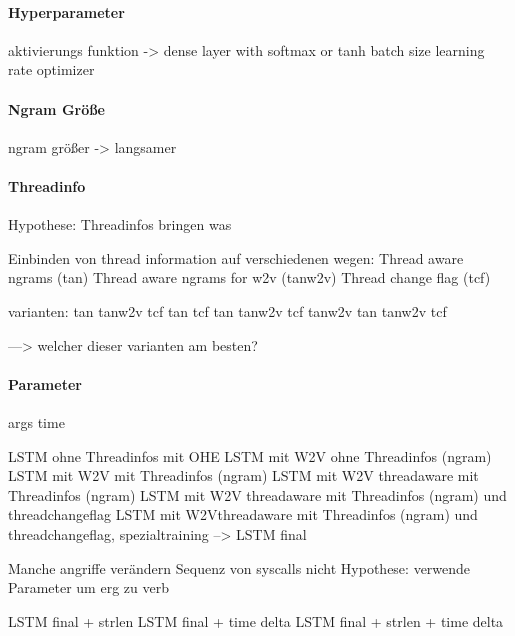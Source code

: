             \paragraph{Hyperparameter}
                aktivierungs funktion
                -> dense layer with softmax or tanh
                batch size
                learning rate
                optimizer

            \paragraph{Ngram Größe}
                ngram größer -> langsamer

            \paragraph{Threadinfo}
                Hypothese:
                Threadinfos bringen was

                Einbinden von thread information auf verschiedenen wegen:
                Thread aware ngrams (tan)
                Thread aware ngrams for w2v (tanw2v)
                Thread change flag (tcf)

                varianten:
                tan
                tanw2v
                tcf
                tan tcf
                tan tanw2v
                tcf tanw2v
                tan tanw2v tcf

                ---> welcher dieser varianten am besten?

            \paragraph{Parameter}
                args
                time

                \ac{LSTM} ohne Threadinfos mit OHE
                LSTM mit W2V ohne Threadinfos (ngram)
                LSTM mit W2V mit Threadinfos (ngram)
                LSTM mit W2V threadaware mit Threadinfos (ngram)
                LSTM mit W2V threadaware mit Threadinfos (ngram) und threadchangeflag
                LSTM mit W2Vthreadaware mit Threadinfos (ngram) und threadchangeflag, spezialtraining
                --> LSTM final

                Manche angriffe verändern Sequenz von syscalls nicht
                Hypothese:
                verwende Parameter um erg zu verb

                LSTM final + strlen
                LSTM final + time delta
                LSTM final + strlen + time delta

